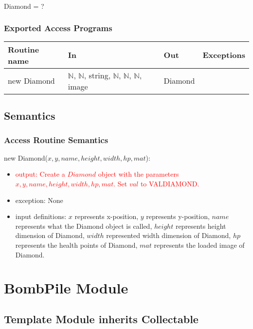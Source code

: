 \documentclass[12pt]{article}
\newcommand{\m}[1]{\mbox{#1}}
\begin{document}
Diamond = ?

\subsubsection*{Exported Access Programs}

\begin{tabular}{| l | l | l | l |}
\hline
\textbf{Routine name} & \textbf{In} & \textbf{Out} & \textbf{Exceptions}\\
\hline
new Diamond & $\mathbb{N}$, $\mathbb{N}$, string, $\mathbb{N}$, $\mathbb{N}$, $\mathbb{N}$, image & Diamond & ~\\
\hline
\end{tabular}

\subsection*{Semantics}

\subsubsection*{Access Routine Semantics}

new Diamond($x, y, name, height, width, hp, mat$):
\begin{itemize}
    \item \textcolor{red}{output: Create a $Diamond$ object with the parameters $x, y, name, height, width, hp, mat$. Set $val$ to VALDIAMOND.}
    \item exception: None
    \item input definitions: $x$ represents x-position, $y$ represents y-position, $name$ represents what the Diamond object is called, $height$ represents height dimension of Diamond, $width$ represented width dimension of Diamond, $hp$ represents the health points of Diamond, $mat$ represents the loaded image of Diamond.
\end{itemize}

\newpage

\section*{BombPile Module}

\subsection*{Template Module inherits Collectable}
\end{document}
